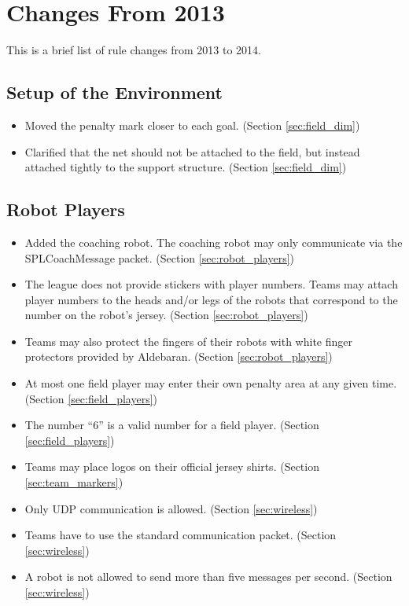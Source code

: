 \documentclass[12pt]{article}
\begin{document}
\newpage


\section{Changes From 2013}
This is a brief list of rule changes from 2013 to 2014.

\subsection*{Setup of the Environment}
\begin{itemize}
	\item Moved the penalty mark closer to each goal. (Section \ref{sec:field_dim})
	\item Clarified that the net should not be attached to the field, but instead attached tightly to the support structure. (Section \ref{sec:field_dim})
\end{itemize}

\subsection*{Robot Players}
\begin{itemize}
   \item Added the coaching robot. The coaching robot may only communicate via the SPLCoachMessage packet. (Section \ref{sec:robot_players})
	\item The league does not provide stickers with player numbers.  Teams may attach player numbers to the heads and/or legs of the robots that correspond to the number on the robot's jersey. (Section \ref{sec:robot_players})
	\item Teams may also protect the fingers of their robots with white finger protectors provided by Aldebaran. (Section \ref{sec:robot_players})
	\item At most one field player may enter their own penalty area at any given time. (Section \ref{sec:field_players})
	\item The number ``6'' is a valid number for a field player. (Section \ref{sec:field_players})
	\item Teams may place logos on their official jersey shirts. (Section \ref{sec:team_markers})
	\item Only UDP communication is allowed. (Section \ref{sec:wireless})
    \item Teams have to use the standard communication packet. (Section \ref{sec:wireless})
    \item A robot is not allowed to send more than five messages per second. (Section \ref{sec:wireless})
\end{itemize}
\end{document}
